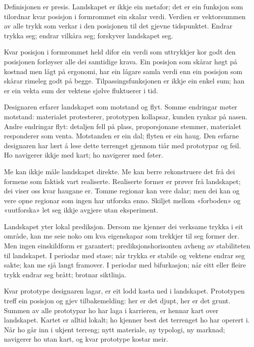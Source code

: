 
Definisjonen er presis. Landskapet er ikkje ein metafor; det er ein funksjon som tilordnar kvar posisjon i formrommet ein skalar verdi. Verdien er vektorsummen av alle trykk som verkar i den posisjonen til det gjevne tidspunktet. Endrar trykka seg; endrar vilkåra seg; forskyver landskapet seg.

Kvar posisjon i formrommet held difor ein verdi som uttrykkjer kor godt den posisjonen forløyser alle dei samtidige krava. Ein posisjon som skårar høgt på kostnad men lågt på ergonomi, har ein lågare samla verdi enn ein posisjon som skårar rimeleg godt på begge. Tilpassingsfunksjonen er ikkje ein enkel sum; han er ein vekta sum der vektene sjølve fluktuerer i tid.

Designaren erfarer landskapet som motstand og flyt. Somme endringar møter motstand: materialet protesterer, prototypen kollapsar, kunden rynkar på nasen. Andre endringar flyt: detaljen fell på plass, proporsjonane stemmer, materialet responderer som venta. Motstanden er ein dal; flyten er ein haug. Den erfarne designaren har lært å lese dette terrenget gjennom tiår med prototypar og feil. Ho navigerer ikkje med kart; ho navigerer med føter.


Me kan ikkje måle landskapet direkte. Me kan berre rekonstruere det frå dei formene som faktisk vart realiserte. Realiserte former er prøver frå landskapet; dei viser oss kvar haugane er. Tomme regionar kan vere dalar; men dei kan og vere opne regionar som ingen har utforska enno. Skiljet mellom «forboden» og «uutforska» let seg ikkje avgjere utan eksperiment.

Landskapet yter lokal prediksjon. Dersom me kjenner dei verksame trykka i eit område, kan me seie noko om kva eigenskapar som trekkjer til seg former der. Men ingen einskildform er garantert; prediksjonshorisonten avheng av stabiliteten til landskapet. I periodar med stase; når trykka er stabile og vektene endrar seg sakte; kan me sjå langt framover. I periodar med bifurkasjon; når eitt eller fleire trykk endrar seg brått; brotnar siktlinja.

Kvar prototype designaren lagar, er eit lodd kasta ned i landskapet. Prototypen treff ein posisjon og gjev tilbakemelding: her er det djupt, her er det grunt. Summen av alle prototypar ho har laga i karrieren, er hennar kart over landskapet. Kartet er alltid lokalt; ho kjenner best det terrenget ho har operert i. Når ho går inn i ukjent terreng; nytt materiale, ny typologi, ny marknad; navigerer ho utan kart, og kvar prototype kostar meir.

